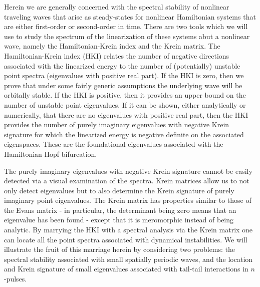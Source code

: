 \documentclass[review,onefignum,onetabnum]{siamart171218}
\begin{document}
Herein we are generally concerned with the spectral stability of nonlinear traveling waves that arise as steady-states for nonlinear Hamiltonian systems that are either first-order or second-order in time.  There are two tools which we will use to study the spectrum of the linearization of these systems abut a nonlinear wave, namely the Hamiltonian-Krein index and the Krein matrix. The Hamiltonian-Krein index (HKI) relates the number of negative directions associated with the linearized energy to the number of (potentially) unstable point spectra (eigenvalues with positive real part). If the HKI is zero, then we prove that under some fairly generic assumptions the underlying wave will be orbitally stable. If the HKI is positive, then it provides an upper bound on the number of unstable point eigenvalues. If it can be shown, either analytically or numerically, that there are no eigenvalues with positive real part, then the HKI provides the number of purely imaginary eigenvalues with negative Krein signature for which the linearized energy is negative definite on the associated eigenspaces. These are the foundational eigenvalues associated with the Hamiltonian-Hopf bifurcation.

The purely imaginary eigenvalues with negative Krein signature cannot be easily detected via a visual examination of the spectra. Krein matrices allow us to not only detect eigenvalues but to also determine the Krein signature of purely imaginary point eigenvalues. The Krein matrix has properties similar to those of the Evans matrix - in particular, the determinant being zero means that an eigenvalue has been found - except that it is meromorphic instead of being analytic.  By marrying the HKI with a spectral analysis via the Krein matrix one can locate all the point spectra associated with dynamical instabilities. We will illustrate the fruit of this marriage herein by considering two problems: the spectral stability associated with small spatially periodic waves, and the location and Krein signature of small eigenvalues associated with tail-tail interactions in $n$-pulses.
\end{document}
